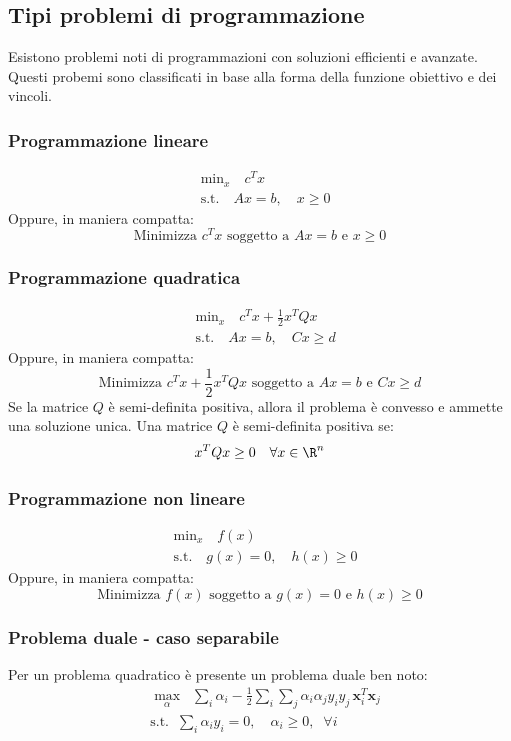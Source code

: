 \subsection{Tipi problemi di programmazione}
Esistono problemi noti di programmazioni con soluzioni efficienti e avanzate. Questi probemi sono classificati in base alla forma della funzione obiettivo e dei vincoli.
\subsubsection{Programmazione lineare}
\begin{align*}
	 & \text{min}_{x} \quad c^T x               \\
	 & \text{s.t.} \quad Ax = b, \quad x \geq 0
\end{align*}
Oppure, in maniera compatta:
\[
	\text{Minimizza } c^T x \text{ soggetto a } Ax = b \text{ e } x \geq 0
\]

\subsubsection{Programmazione quadratica}
\begin{align*}
	 & \text{min}_{x} \quad c^T x + \frac{1}{2}x^T Q x \\
	 & \text{s.t.} \quad Ax = b, \quad Cx \geq d
\end{align*}
Oppure, in maniera compatta:
\[
	\text{Minimizza } c^T x + \frac{1}{2}x^T Q x \text{ soggetto a } Ax = b \text{ e } Cx \geq d
\]
Se la matrice $ Q $ è semi-definita positiva, allora il problema è convesso e ammette una soluzione unica. Una matrice $ Q $ è semi-definita positiva se:
\[
	x^{T}Qx \geq 0 \quad \forall x \in \R^{n}
\]

\subsubsection{Programmazione non lineare}
\begin{align*}
	 & \text{min}_{x} \quad f(x)                     \\
	 & \text{s.t.} \quad g(x) = 0, \quad h(x) \geq 0
\end{align*}
Oppure, in maniera compatta:
\[
	\text{Minimizza } f(x) \text{ soggetto a } g(x) = 0 \text{ e } h(x) \geq 0
\]

\subsubsection{Problema duale - caso separabile}
Per un problema quadratico è presente un problema duale ben noto:
\[
	\begin{aligned}
		 & \max_{\alpha} \;\; \sum_{i} \alpha_i - \frac{1}{2} \sum_{i} \sum_{j} \alpha_i \alpha_j y_i y_j\, \mathbf{x}_i^T \mathbf{x}_j \\
		 & \text{s.t.} \;\; \sum_{i} \alpha_i y_i = 0,\quad \alpha_i \geq 0, \;\; \forall i
	\end{aligned}
\]

